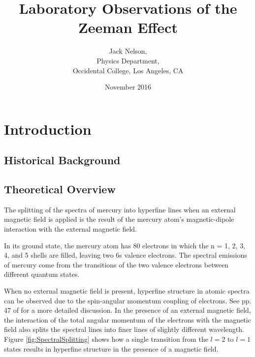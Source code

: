 \documentclass[twocolumn]{article}
\title{Laboratory Observations of the Zeeman Effect}
\author{Jack Nelson,\\
	Physics Department,\\
	Occidental College, Los Angeles, CA}
\date{November 2016}
\begin{document}
\maketitle

\begin{abstract}
	
\end{abstract}

\section{Introduction} \label{sec:Intro}
	\subsection{Historical Background}

	\subsection{Theoretical Overview} \label{sec:Theory}
		The splitting of the spectra of mercury into hyperfine lines when an external magnetic field is applied is the result of the mercury atom's magnetic-dipole interaction with the external magnetic field.
		 
		In its ground state, the mercury atom has 80 electrons in which the n = 1, 2, 3, 4, and 5 shells are filled, leaving two 6s valence electrons.
		The spectral emissions of mercury come from the transitions of the two valence electrons between different quantum states.
		
		When no external magnetic field is present, hyperfine structure in atomic spectra can be observed due to the spin-angular momentum coupling of electrons. 
		See pp. 47 of \cite{melissinos_experiments_1966} for a more detailed discussion.
		In the presence of an external magnetic field, the interaction of the total angular momentum of the electrons with the magnetic field also splits the spectral lines into finer lines of slightly different wavelength.
		Figure \ref{fig:SpectralSplitting} shows how a single transition from the $l=2$ to $l=1$ states results in hyperfine structure in the presence of a magnetic field.
		
\end{document}
